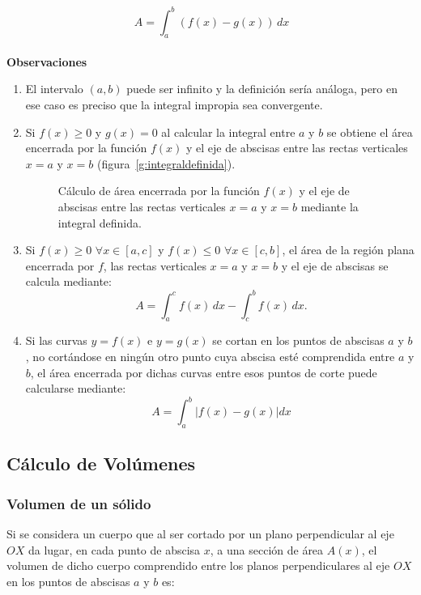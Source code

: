 \[
\ A = \int_{a}^{b}{(f(x)- g(x))\,dx}
\]\\

\noindent \textbf{Observaciones}

\begin{enumerate}

\item El intervalo $(a,b)$ puede ser infinito y la definición sería análoga, pero en ese caso es preciso que la integral impropia sea convergente.

\item Si $f(x)\geq0$ y $g(x)=0$ al calcular la integral entre $a$ y $b$ se obtiene el área encerrada por la función $f(x)$ y el eje de abscisas entre las rectas verticales $x=a$ y $x=b$ (figura~\ref{g:integraldefinida}).

\begin{figure}[h!]
\begin{center}
\scalebox{1}{}
\caption{Cálculo de área encerrada por la función $f(x)$ y el eje de
abscisas entre las rectas verticales $x=a$ y $x=b$  mediante la
integral definida.} \label{g:integral_definida}
\end{center}
\end{figure}

\item Si $f(x)\geq 0$ $\forall x\in[a,c]$ y $f(x)\leq 0$ $\forall x\in[c,b]$, el área de la región plana encerrada por $f$, las rectas verticales $x=a$ y $x=b$ y el eje de abscisas se calcula
mediante:
\[
\ A= \int_{a}^{c}{f(x)\,dx} - \int_{c}^{b}{f(x)\,dx}.
\]

\item Si las curvas $y=f(x)$ e $y=g(x)$ se cortan en los puntos de abscisas $a$ y $b$, no cortándose en ningún otro punto cuya abscisa esté comprendida entre $a$ y $b$, el área encerrada por dichas curvas entre esos puntos de corte puede calcularse
mediante:
\[
\ A= \int_{a}^{b}{|f(x)-g(x)|dx}
\]
\end{enumerate}


\subsection*{Cálculo de Volúmenes}

\subsubsection*{Volumen de un sólido}
Si se considera un cuerpo que al ser cortado por un plano
perpendicular al eje $OX$ da lugar, en cada punto de abscisa $x$, a
una sección de área $A(x)$, el volumen de dicho cuerpo comprendido
entre los planos perpendiculares al eje $OX$ en los puntos de
abscisas $a$ y $b$ es:

